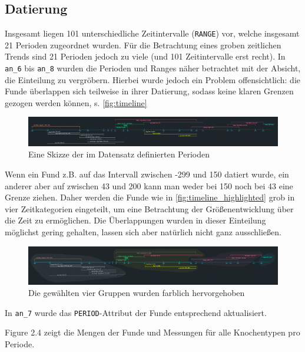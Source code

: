 \subsection{Datierung}

Insgesamt liegen 101 unterschiedliche Zeitintervalle (\texttt{RANGE}) vor, welche insgesamt 21 Perioden zugeordnet wurden. Für die Betrachtung eines groben zeitlichen Trends sind 21 Perioden jedoch zu viele (und 101 Zeitintervalle erst recht). 
In \texttt{an\_6} bis \texttt{an\_8} wurden die Perioden und Ranges näher betrachtet mit der Absicht, die Einteilung zu vergröbern. Hierbei wurde jedoch ein Problem offensichtlich: die Funde überlappen sich teilweise in ihrer Datierung, sodass keine klaren Grenzen gezogen werden können, s. \autoref{fig:timeline}

\begin{figure}[H]
    \centering
    \includegraphics[width=\textwidth]{docs/latex/attachments/ab-project_timeline.png}
    \caption{Eine Skizze der im Datensatz definierten Perioden}
    \label{fig:timeline}
\end{figure}

Wenn ein Fund z.B. auf das Intervall zwischen -299 und 150 datiert wurde, ein anderer aber auf zwischen 43 und 200 kann man weder bei 150 noch bei 43 eine Grenze ziehen.
Daher werden die Funde wie in \autoref{fig:timeline_highlighted} grob in vier Zeitkategorien eingeteilt, um eine Betrachtung der Größenentwicklung über die Zeit zu ermöglichen. 
Die Überlappungen wurden in dieser Einteilung möglichst gering gehalten, lassen sich aber natürlich nicht ganz ausschließen.

\begin{figure}[H]
    \centering
    \includegraphics[width=\textwidth]{docs/latex/attachments/ab-project_timeline-highlighted.png}
    \caption{Die gewählten vier Gruppen wurden farblich hervorgehoben}
    \label{fig:timeline_highlighted}
\end{figure}

In \texttt{an\_7} wurde das \texttt{PERIOD}-Attribut der Funde entsprechend aktualisiert.

Figure 2.4 zeigt die Mengen der Funde und Messungen für alle Knochentypen pro Periode.
